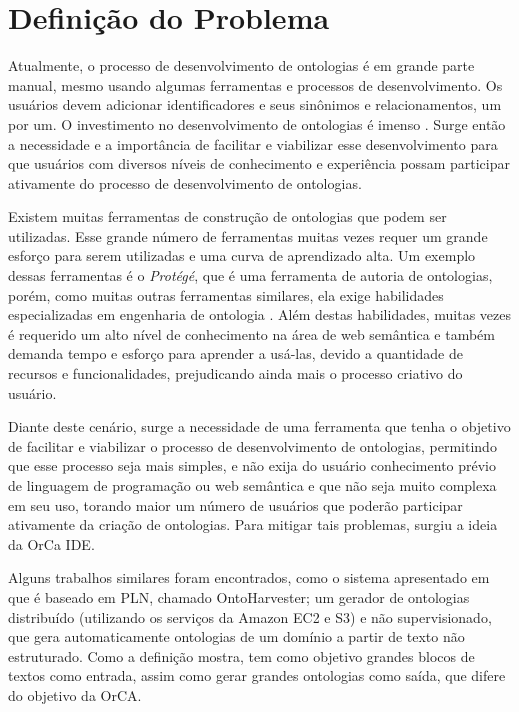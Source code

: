 \documentclass{bcc}
\begin{document}

\section{Definição do Problema}

Atualmente, o processo de desenvolvimento de ontologias é em grande parte manual, mesmo usando algumas ferramentas e processos de desenvolvimento. Os usuários devem adicionar identificadores e seus sinônimos e relacionamentos, um por um. O investimento no desenvolvimento de ontologias é imenso \cite{liu2011}. Surge então a necessidade e a importância de facilitar e viabilizar esse desenvolvimento para que usuários com diversos níveis de conhecimento e experiência possam participar ativamente do processo de desenvolvimento de ontologias.

Existem muitas ferramentas de construção de ontologias que podem ser utilizadas. Esse grande número de ferramentas muitas vezes requer um grande esforço para serem utilizadas e uma curva de aprendizado alta. Um exemplo dessas ferramentas é o \textit{Protégé}, que é uma ferramenta de autoria de ontologias, porém, como muitas outras ferramentas similares, ela exige habilidades especializadas em engenharia de ontologia \cite{funk2007}. Além destas habilidades, muitas vezes é requerido um alto nível de conhecimento na área de web semântica e também demanda tempo e esforço para aprender a usá-las, devido a quantidade de recursos e funcionalidades, prejudicando ainda mais o processo criativo do usuário.

Diante deste cenário, surge a necessidade de uma ferramenta que tenha o objetivo de facilitar e viabilizar o processo de desenvolvimento de ontologias, permitindo que esse processo seja mais simples, e não exija do usuário conhecimento prévio de linguagem de programação ou web semântica e que não seja muito complexa em seu uso, torando maior um número de usuários que poderão participar ativamente da criação de ontologias. Para mitigar tais problemas, surgiu a ideia da OrCa IDE.

Alguns trabalhos similares foram encontrados, como o sistema apresentado em \cite{mousavi2013} que é baseado em PLN, chamado OntoHarvester; um gerador de ontologias distribuído (utilizando os serviços da Amazon EC2 e S3) e não supervisionado, que gera automaticamente ontologias de um domínio a partir de texto não estruturado. Como a definição mostra, tem como objetivo grandes blocos de textos como entrada, assim como gerar grandes ontologias como saída, que difere do objetivo da OrCA. 
\end{document}
